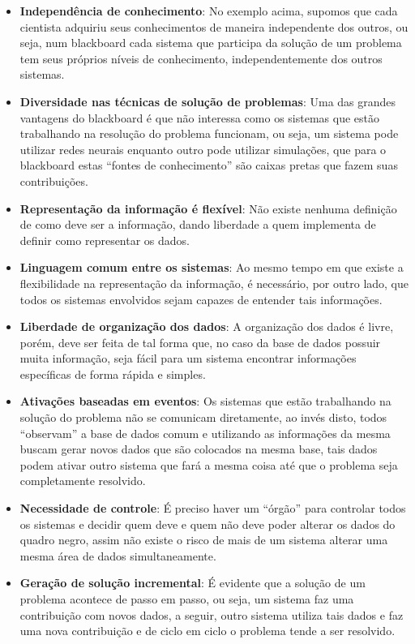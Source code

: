 	 \begin{itemize}
	 \item \textbf{Independência de conhecimento}: No exemplo acima, supomos que cada cientista adquiriu seus conhecimentos de maneira independente dos outros, ou seja, num blackboard cada sistema que participa da solução de um problema tem seus próprios níveis de conhecimento, independentemente dos outros sistemas.
	 \item \textbf{Diversidade nas técnicas de solução de problemas}: Uma das grandes vantagens do blackboard é que não interessa como os sistemas que estão trabalhando na resolução do problema funcionam, ou seja, um sistema pode utilizar redes neurais enquanto outro pode utilizar simulações, que para o blackboard estas “fontes de conhecimento” são caixas pretas que fazem suas contribuições.
	 \item \textbf{Representação da informação é flexível}: Não existe nenhuma definição de como deve ser a informação, dando liberdade a quem implementa de definir como representar os dados.
	 \item \textbf{Linguagem comum entre os sistemas}: Ao mesmo tempo em que existe a flexibilidade na representação da informação, é necessário, por outro lado, que todos os sistemas envolvidos sejam capazes de entender tais informações.
	 \item \textbf{Liberdade de organização dos dados}: A organização dos dados é livre, porém, deve ser feita de tal forma que, no caso da base de dados possuir muita informação, seja fácil para um sistema encontrar informações específicas de forma rápida e simples.
	 \item \textbf{Ativações baseadas em eventos}: Os sistemas que estão trabalhando na solução do problema não se comunicam diretamente, ao invés disto, todos “observam” a base de dados comum e utilizando as informações da mesma buscam gerar novos dados que são colocados na mesma base, tais dados podem ativar outro sistema que fará a mesma coisa até que o problema seja completamente resolvido.
	 \item \textbf{Necessidade de controle}: É preciso haver um “órgão” para controlar todos os sistemas e decidir quem deve e quem não deve poder alterar os dados do quadro negro, assim não existe o risco de mais de um sistema alterar uma mesma área de dados simultaneamente.
	 \item \textbf{Geração de solução incremental}: É evidente que a solução de um problema acontece de passo em passo, ou seja, um sistema faz uma contribuição com novos dados, a seguir, outro sistema utiliza tais dados e faz uma nova contribuição e de ciclo em ciclo o problema tende a ser resolvido. 
	 \end{itemize}

